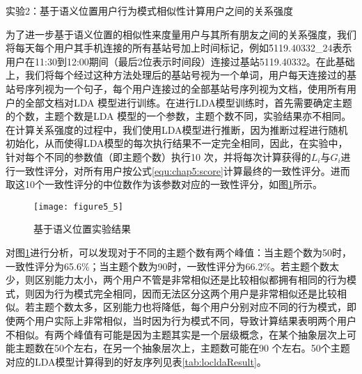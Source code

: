 \par 实验2：基于语义位置用户行为模式相似性计算用户之间的关系强度
\par 为了进一步基于语义位置的相似性来度量用户与其所有朋友之间的关系强度，我们将每天每个用户其手机连接的所有基站号加上时间标记，例如\'5119.40332\_24\'表示用户在11:30到12:00期间（最后2位表示时间段）连接过基站5119.40332。在此基础上，我们将每个经过这种方法处理后的基站号视为一个单词，用户每天连接过的基站号序列视为一个句子，每个用户连接过的全部基站号序列视为文档，使用所有用户的全部文档对LDA 模型进行训练。在进行LDA模型训练时，首先需要确定主题的个数，主题个数是LDA 模型的一个参数，主题个数不同，实验结果亦不相同。在计算关系强度的过程中，我们使用LDA模型进行推断，因为推断过程进行随机初始化，从而使得LDA模型的每次执行结果不一定完全相同，因此，在实验中，针对每个不同的参数值（即主题个数）执行10 次，并将每次计算获得的$L_{i}$与$G_{i}$进行一致性评分，对所有用户按公式\ref{equ:chap5:score}计算最终的一致性评分。进而取这10个一致性评分的中位数作为该参数对应的一致性评分，如图\ref{fig:5_5}所示。
\begin{figure}[htp]
\centering
\texttt{[image: figure5\_5]}
\caption{基于语义位置实验结果}
\label{fig:5_5}
\end{figure}
\par 对图\ref{fig:5_5}进行分析，可以发现对于不同的主题个数有两个峰值：当主题个数为50时，一致性评分为65.6\%；当主题个数为90时，一致性评分为66.2\%。若主题个数太少，则区别能力太小，两个用户不管是非常相似还是比较相似都拥有相同的行为模式，则因为行为模式完全相同，因而无法区分这两个用户是非常相似还是比较相似。若主题个数太多，区别能力也将降低，每个用户分别对应不同的行为模式，即使两个用户实际上非常相似，当时因为行为模式不同，导致计算结果表明两个用户不相似。有两个峰值有可能是因为主题其实是一个层级概念，在某个抽象层次上可能主题数在50个左右，在另一个抽象层次上，主题数可能在90 个左右。50个主题对应的LDA模型计算得到的好友序列见表\ref{tab:locldaResult}。
